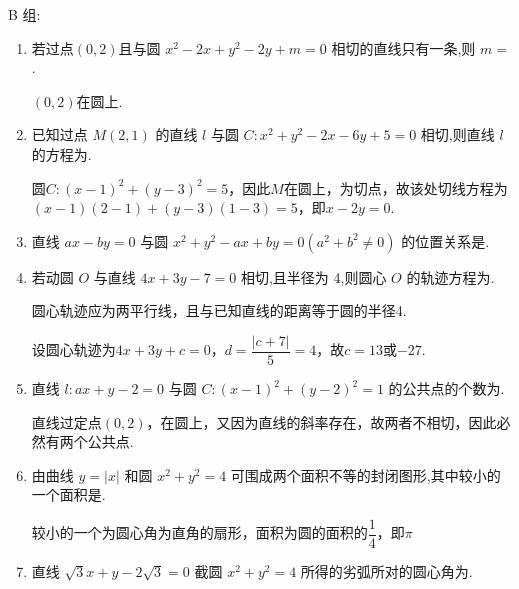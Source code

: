 B 组:

\begin{enumerate}
    \item 若过点$(0,2)$且与圆 ${x}^{2} - {2x} + {y}^{2} - {2y} + m = 0$ 相切的直线只有一条,则 $m =$ .
    \begin{jieda}
        $(0,2)$在圆上.
    \end{jieda}

    \item 已知过点 $M\left( {2,1}\right)$ 的直线 $l$ 与圆 $C : {x}^{2} + {y}^{2} - {2x} - {6y} + 5 = 0$ 相切,则直线 $l$ 的方程为.
    \begin{jieda}
        圆$C: (x-1)^2+(y-3)^2 = 5$，因此$M$在圆上，为切点，故该处切线方程为$(x-1)(2-1)+(y-3)(1-3) = 5$，即$x-2y=0$.
    \end{jieda}

    \item 直线 ${ax} - {by} = 0$ 与圆 ${x}^{2} + {y}^{2} - {ax} + {by} = 0\left( {{a}^{2} + {b}^{2} \neq  0}\right)$ 的位置关系是.

    \item 若动圆 $O$ 与直线 ${4x} + {3y} - 7 = 0$ 相切,且半径为 4,则圆心 $O$ 的轨迹方程为.
    \begin{jieda}
        圆心轨迹应为两平行线，且与已知直线的距离等于圆的半径4.

        设圆心轨迹为$4x+3y+c=0$，$d = \dfrac{|c+7|}{5} = 4$，故$c = 13$或$-27$.
    \end{jieda}

    \item 直线 $l : {ax} + y - 2 = 0$ 与圆 $C : {\left( x - 1\right) }^{2} + {\left( y - 2\right) }^{2} = 1$ 的公共点的个数为.
    \begin{jieda}
        直线过定点$(0, 2)$，在圆上，又因为直线的斜率存在，故两者不相切，因此必然有两个公共点.
    \end{jieda}

    \item 由曲线 $y = \left| x\right|$ 和圆 ${x}^{2} + {y}^{2} = 4$ 可围成两个面积不等的封闭图形,其中较小的一个面积是\blkda[2]{$\pi$}.
    \begin{jieda}
        较小的一个为圆心角为直角的扇形，面积为圆的面积的$\dfrac{1}{4}$，即$\pi$
    \end{jieda}

    \item 直线 $\sqrt{3}x + y - 2\sqrt{3} = 0$ 截圆 ${x}^{2} + {y}^{2} = 4$ 所得的劣弧所对的圆心角为.


\end{enumerate}
